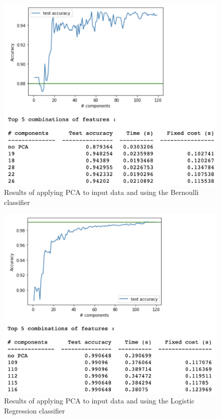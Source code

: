 \begin{appendix}
    \begin{figure}[!ht]
    \centering
      \includegraphics[width=0.68\linewidth]{Figures/bernoulli_pca.png}
      \caption{Results of applying PCA to input data and using the Bernoulli classifier}
      \label{fig:bernoulli_pca}
    \end{figure}
    
    \begin{figure}[!ht]
    \centering
      \includegraphics[width=0.68\linewidth]{Figures/logreg_pca.png}
      \captionsetup{justification=centering}
      \caption{Results of applying PCA to input data and using the Logistic Regression classifier}
      \label{fig:logreg_pca}
    \end{figure}
    

\end{appendix}
